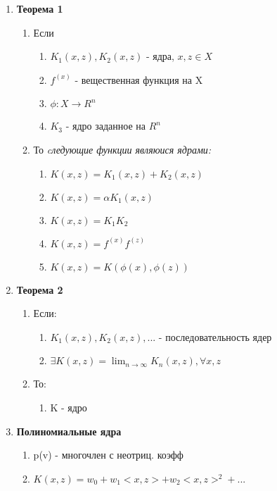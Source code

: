\documentclass[a4paper, 12pt]{article}
\begin{document}
\begin{enumerate}
    \item \textbf{Теорема 1}
    \begin{enumerate}
        \item Если
        \begin{enumerate}
            \item $K_{1}(x, z), K_{2}(x, z)$ - ядра, $x, z \in X$
            \item $f^{(x)}$ - вещественная функция на X
            \item $\phi: X \rightarrow R^{n}$
            \item $K_{3}$ - ядро заданное на $R^{n}$
        \end{enumerate}
        \item То \textit{cледующие функции являюися ядрами:}
        \begin{enumerate}
            \item $K(x, z) = K_{1}(x, z) + K_{2}(x, z)$
            \item $K(x, z) = \alpha K_{1}(x, z)$
            \item $K(x, z) = K_{1}K_{2}$
            \item $K(x, z) = f^{(x)}f^{(z)}$
            \item $K(x, z) = K(\phi(x), \phi(z))$
        \end{enumerate}
    \end{enumerate}
    \item \textbf{Теорема 2}
    \begin{enumerate}
        \item Если:
        \begin{enumerate}
                \item $K_{1}(x, z), K_{2}(x, z), ...$ - последовательность ядер
                \item $\exists K(x, z) = \lim_{n \to \infty}K_{n}(x, z), \forall x, z$
        \end{enumerate}
        \item То:
        \begin{enumerate}
            \item K - ядро
        \end{enumerate}
    \end{enumerate}
    \item \textbf{Полиномиальные ядра}
    \begin{enumerate}
        \item p(v) - многочлен с неотриц. коэфф
        \item $K(x, z) = w_{0} + w_{1}<x, z> + w_{2}<x, z>^{2} + ...$

\end{enumerate}
\end{enumerate}
\end{document}

